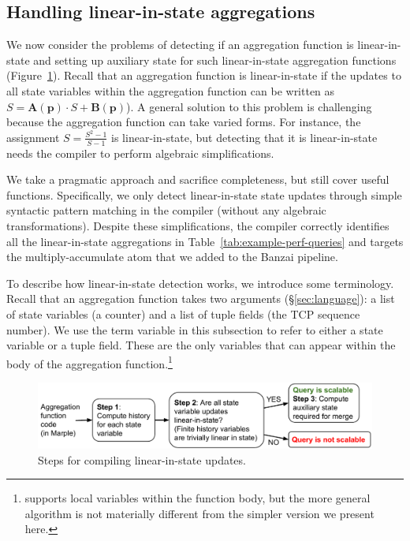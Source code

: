 \subsection{Handling linear-in-state aggregations}
\label{sec:linear-in-state-compilation}

We now consider the problems of detecting if an aggregation function is
linear-in-state and setting up auxiliary state for such linear-in-state
aggregation functions (Figure~\ref{fig:compiler-steps}). Recall that an
aggregation function is linear-in-state if the updates to all state variables
within the aggregation function can be written as $S =
\boldsymbol{A}(\mathbf{p}) \cdot S + \boldsymbol{B}(\mathbf{p})$).  A general
solution to this problem is challenging because the aggregation function can
take varied forms. For instance, the assignment $S = \frac{S^2 - 1}{S -1}$ is
linear-in-state, but detecting that it is linear-in-state needs the compiler to
perform algebraic simplifications.

We take a pragmatic approach and sacrifice completeness, but still cover useful
functions. Specifically, we only detect linear-in-state state updates through
simple syntactic pattern matching in the compiler (\ie without any algebraic
transformations).  Despite these simplifications, the \TheSystem compiler
correctly identifies all the linear-in-state aggregations in
Table~\ref{tab:example-perf-queries} and targets the multiply-accumulate atom
that we added to the Banzai pipeline.

To describe how linear-in-state detection works, we introduce some terminology.
Recall that an aggregation function takes two arguments (\S\ref{sec:language}):
a list of state variables (\eg a counter) and a list of tuple fields (\eg the
TCP sequence number). We use the term variable in this subsection to refer to
either a state variable or a tuple field. These are the only variables that can
appear within the body of the aggregation function.\footnote{\TheSystem
supports local variables within the function body, but the more general
algorithm is not materially different from the simpler version we present
here.}

\begin{figure}
\centering
\includegraphics[width=\columnwidth]{pq_compiler-steps.pdf}
\caption{Steps for compiling linear-in-state updates.}
\label{fig:compiler-steps}
\end{figure}

